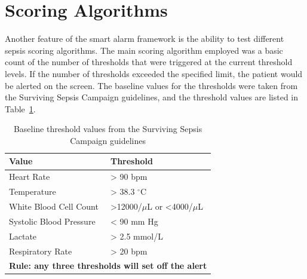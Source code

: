 \documentclass{sig-alternate}
\begin{document}
\vspace{10pt}
\section{Scoring Algorithms}
\vspace{10pt}
\label{sec:scoring}

Another feature of the smart alarm framework is the ability to test different sepsis scoring algorithms.  The main scoring algorithm employed was a basic count of the number of thresholds that were triggered at the current threshold levels.  If the number of thresholds exceeded the specified limit, the patient would be alerted on the screen.  The baseline values for the thresholds were taken from the Surviving Sepsis Campaign guidelines, and the threshold values are listed in Table~\ref{tab:threshold_table}.  

\begin{table}
\renewcommand{\arraystretch}{1.5}
  \begin{tabular}{| l | l |}
\hline

{\bf Value} & {\bf Threshold}\\ \hline
Heart Rate & > 90 bpm\\ \hline
Temperature & > 38.3 $^\circ$C\\ \hline
White Blood Cell Count & >12000/$\mu$L  or <4000/$\mu$L\\ \hline
Systolic Blood Pressure & < 90 mm Hg\\ \hline
Lactate & > 2.5 mmol/L\\ \hline
Respiratory Rate & > 20 bpm\\ \hline
 \multicolumn{2}{|p{7cm}|}{\bf Rule: any three thresholds will set off the alert} \\ \hline
 \end{tabular}
	\caption{Baseline threshold values from the Surviving Sepsis Campaign guidelines}
  \label{tab:threshold_table}
\end{table}
\end{document}
